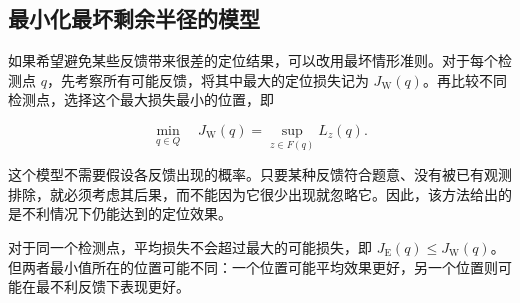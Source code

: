 \subsection{最小化最坏剩余半径的模型}

如果希望避免某些反馈带来很差的定位结果，可以改用最坏情形准则。对于每个检测点 \(q\)，先考察所有可能反馈，将其中最大的定位损失记为 \(J_{\mathrm W}(q)\)。再比较不同检测点，选择这个最大损失最小的位置，即

\begin{equation}
 \min_{q\in Q}\quad J_{\mathrm W}(q)=\sup_{z\in F(q)}L_z(q).
\label{eq:q2-pair-worst-objective}
\end{equation}

这个模型不需要假设各反馈出现的概率。只要某种反馈符合题意、没有被已有观测排除，就必须考虑其后果，而不能因为它很少出现就忽略它。因此，该方法给出的是不利情况下仍能达到的定位效果。

对于同一个检测点，平均损失不会超过最大的可能损失，即 \(J_{\mathrm E}(q)\le J_{\mathrm W}(q)\)。但两者最小值所在的位置可能不同：一个位置可能平均效果更好，另一个位置则可能在最不利反馈下表现更好。

